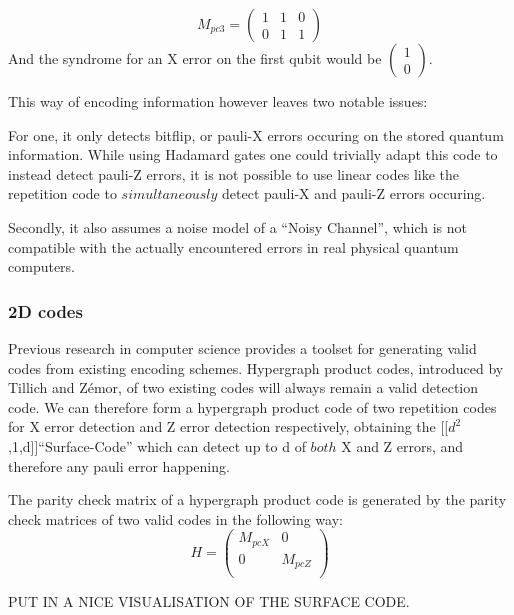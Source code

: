 \begin{equation}
	M_{pc3} = \left( 
	\begin{array}{ccc}
		1 & 1 & 0 \\
		0 & 1 & 1
	\end{array}
	\right)
\end{equation}
And the syndrome for an X error on the first qubit would be
$\left(\begin{array}{c}1\\0\end{array}\right)$.

This way of encoding information however leaves two notable
issues:

For one, it only detects bitflip, or pauli-X errors occuring on
the stored quantum information. While using Hadamard gates one
could trivially adapt this code to instead detect pauli-Z errors,
it is not possible to use linear codes like the repetition code
to $simultaneously$ detect pauli-X and pauli-Z errors occuring.

Secondly, it also assumes a noise model of a ``Noisy Channel'',
which is not compatible with the actually encountered errors in
real physical quantum computers.
\newpage
\subsubsection{2D codes}
Previous research in computer science 
provides a toolset for generating valid codes
from existing encoding schemes. 
Hypergraph product codes, introduced by Tillich and Z\'emor,
of two 
existing codes will always remain a valid detection code.
We can therefore form a hypergraph product code of two repetition
codes for X error detection and Z error detection respectively,
obtaining the [[$d^2$,1,d]]``Surface-Code'' which can detect up
to d of $both$ X and Z errors, and 
therefore any pauli error happening.

The parity check matrix of a hypergraph product code is generated
by the parity check matrices of two valid codes in the following
way:
\begin{equation}
	H = \left(\begin{array}{cc}
		M_{pcX} & 0 \\
		0 & M_{pcZ} \\
	\end{array}\right)
\end{equation}

PUT IN A NICE VISUALISATION OF THE SURFACE CODE.
